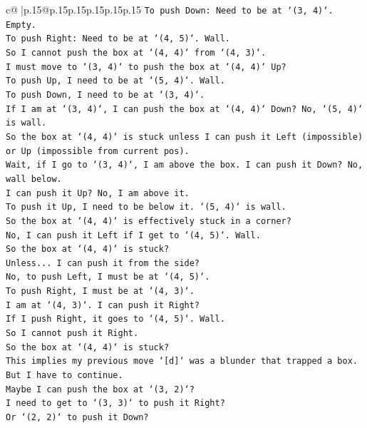\documentclass{article}
\begin{document}
{\begin{supertabular}{c@{$\;$}|p{.15\linewidth}@{}p{.15\linewidth}p{.15\linewidth}p{.15\linewidth}p{.15\linewidth}p{.15\linewidth}}
{{{\texttt{To push Down: Need to be at `(3, 4)`. Empty.} \\
\texttt{To push Right: Need to be at `(4, 5)`. Wall.} \\
\texttt{So I cannot push the box at `(4, 4)` from `(4, 3)`.} \\
\texttt{I must move to `(3, 4)` to push the box at `(4, 4)` Up?} \\
\texttt{To push Up, I need to be at `(5, 4)`. Wall.} \\
\texttt{To push Down, I need to be at `(3, 4)`.} \\
\texttt{If I am at `(3, 4)`, I can push the box at `(4, 4)` Down? No, `(5, 4)` is wall.} \\
\texttt{So the box at `(4, 4)` is stuck unless I can push it Left (impossible) or Up (impossible from current pos).} \\
\texttt{Wait, if I go to `(3, 4)`, I am above the box. I can push it Down? No, wall below.} \\
\texttt{I can push it Up? No, I am above it.} \\
\texttt{To push it Up, I need to be below it. `(5, 4)` is wall.} \\
\texttt{So the box at `(4, 4)` is effectively stuck in a corner?} \\
\texttt{No, I can push it Left if I get to `(4, 5)`. Wall.} \\
\texttt{So the box at `(4, 4)` is stuck?} \\
\texttt{Unless... I can push it from the side?} \\
\texttt{No, to push Left, I must be at `(4, 5)`.} \\
\texttt{To push Right, I must be at `(4, 3)`.} \\
\texttt{I am at `(4, 3)`. I can push it Right?} \\
\texttt{If I push Right, it goes to `(4, 5)`. Wall.} \\
\texttt{So I cannot push it Right.} \\
\texttt{So the box at `(4, 4)` is stuck?} \\
\texttt{This implies my previous move `{[}d{]}` was a blunder that trapped a box.} \\
\texttt{But I have to continue.} \\
\texttt{Maybe I can push the box at `(3, 2)`?} \\
\texttt{I need to get to `(3, 3)` to push it Right?} \\
\texttt{Or `(2, 2)` to push it Down?} \\
}}}
\end{supertabular}}
\end{document}
